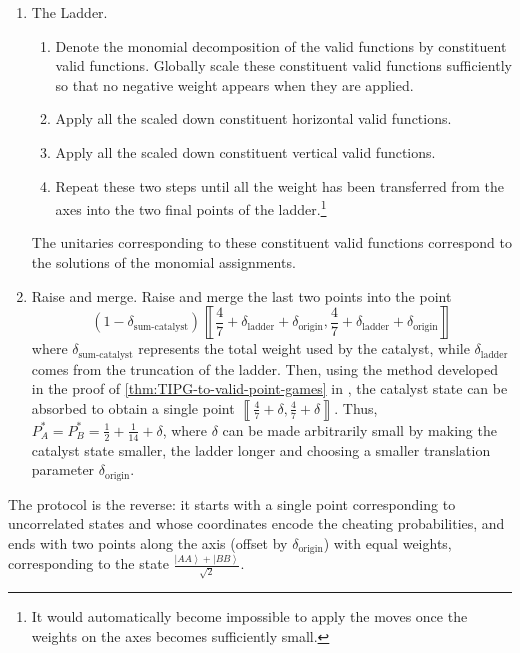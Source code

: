 \documentclass{article}
\newcommand{\atul}[1]{#1} %
\newcommand{\dorigin}[0]{\delta_{\textrm{origin}}} %
\begin{document}
\begin{enumerate}
{{        smaller than that of the points along the $y$\textendash axis.}). }
  \item The Ladder.
        \begin{enumerate}
          \item Denote the monomial decomposition of the valid functions by constituent
                valid functions. Globally scale these constituent valid functions
                sufficiently so that no negative weight appears when they are applied.
          \item Apply all the scaled down constituent horizontal valid functions.
          \item Apply all the scaled down constituent vertical valid functions.
          \item Repeat these two steps until all the weight has been transferred
                from the axes into the two final points of the ladder.\footnote{It would automatically become impossible to apply the moves once the
                  weights on the axes becomes sufficiently small.}
        \end{enumerate}
        The unitaries corresponding to these constituent valid functions
        correspond to the solutions of the monomial assignments.
  \item Raise and merge. Raise and merge the last two points into \atul{the point $$(1-\delta_{\text{sum-catalyst}})\left\llbracket \frac{4}{7}+\delta_{\textrm{ladder}}+\dorigin,\frac{4}{7}+\delta_{\textrm{ladder}}+\dorigin\right\rrbracket$$}where $\delta_{\text{sum-catalyst}}$ represents the total weight used by the catalyst,
        while $\delta_{\textrm{ladder}}$ comes from the truncation of the ladder.
        Then, using the method developed in the proof of \cref{thm:TIPG-to-valid-point-games} in \cite{ACG+14,Mochon07}, the catalyst state can be absorbed to
        obtain a single point $\left\llbracket \frac{4}{7}+\delta,\frac{4}{7}+\delta\right\rrbracket $.
        Thus, $P_{A}^{*}=P_{B}^{*}=\frac{1}{2}+\frac{1}{14}+\delta$, where
        $\delta$ can be made arbitrarily small by making the
        catalyst state smaller, the ladder longer and \atul{choosing a smaller translation parameter $\dorigin$}.
\end{enumerate}
The protocol is the reverse: it starts with a single point
corresponding to uncorrelated states and whose coordinates encode the
cheating probabilities, and ends with two points along the axis \atul{(offset by $\dorigin$)} with
equal weights, corresponding to the state $\frac{\left|AA\right\rangle +\left|BB\right\rangle }{\sqrt{2}}$.
\end{document}
